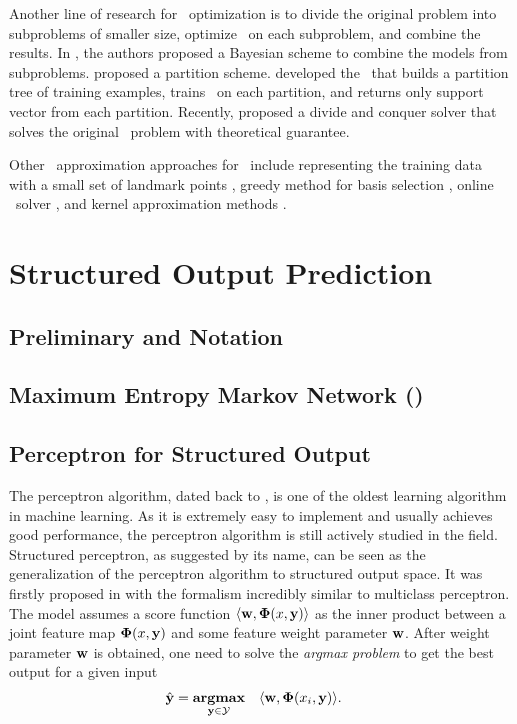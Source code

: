 Another line of research for \svm\ optimization is to divide the original problem into subproblems of smaller size, optimize \svm\ on each subproblem, and combine the results.
In \citep{Tresp00a,Schwaighofer01the}, the authors proposed a Bayesian scheme to combine the models from subproblems.
\citet{Collobert02a} proposed a partition scheme.
\citet{Graf05parallel} developed the \svmcascade\ that builds a partition tree of training examples, trains \svm\ on each partition, and returns only support vector from each partition.
Recently, \citet{Hsieh13a} proposed a divide and conquer solver that solves the original \svm\ problem with theoretical guarantee.

Other \svm\ approximation approaches for \svm\ include representing the training data with a small set of landmark points \citep{Pavlov00towards,Boley04training,Yu05making,Zhang08improved}, greedy method for basis selection \citep{Keerthi06building}, online \svm\ solver \citep{Bordes05fast}, and kernel approximation methods \citep{Zhang12scaling,Le13fast}.





\section{Structured Output Prediction}

%
\subsection{Preliminary and Notation}


%
\subsection{Maximum Entropy Markov Network (\memm)}


%
\subsection{Perceptron for Structured Output}

The perceptron algorithm, dated back to \citep{Rosenblatt58}, is one of the oldest learning algorithm in machine learning.
As it is extremely easy to implement and usually achieves good performance, the perceptron algorithm is still actively studied in the field.
Structured perceptron, as suggested by its name, can be seen as the generalization of the perceptron algorithm to structured output space.
It was firstly proposed in \citep{collins02a, collins02b} with the formalism incredibly similar to multiclass perceptron. 
The model assumes a score function $\langle \mathbf {w}, \mathbf{\Phi}(x,\mathbf {y}) \rangle$ as the inner product between a joint feature map $\mathbf{\Phi}(x,\mathbf {y})$ and some feature weight parameter $\mathbf {w}$.
After weight parameter $\mathbf {w}$ is obtained, one need to solve the \textit{argmax problem} to get the best output for a given input
\begin{align}
	\hat{\mathbf {y}} = \underset{\mathbf {y}\in\mathcal{Y}}{\textbf{argmax}} &\quad \langle \mathbf {w}, \mathbf{\Phi}(x_i,\mathbf {y}) \rangle.  \label{perceptroninference}
\end{align}

